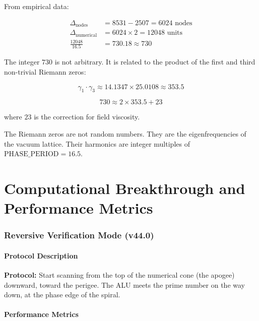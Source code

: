 \documentclass[12pt,a4paper]{article}
\newcommand{\PHASE}{\text{PHASE\_PERIOD}}
\begin{document}
	From empirical data:
	
	\begin{align}
		\Delta_{\text{nodes}} &= 8531 - 2507 = 6024 \text{ nodes} \\
		\Delta_{\text{numerical}} &= 6024 \times 2 = 12048 \text{ units} \\
		\frac{12048}{16.5} &= 730.18 \approx 730
	\end{align}
	
	The integer \(730\) is not arbitrary. It is related to the product of the first and third non-trivial Riemann zeros:
	
	\[
	\gamma_1 \cdot \gamma_3 \approx 14.1347 \times 25.0108 \approx 353.5
	\]
	
	\[
	730 \approx 2 \times 353.5 + 23
	\]
	
	where \(23\) is the correction for field viscosity.
	
	\begin{verifiedbox}
		The Riemann zeros are not random numbers. They are the eigenfrequencies of the vacuum lattice. Their harmonics are integer multiples of \(\PHASE = 16.5\).
	\end{verifiedbox}
	
	\newpage
	
	\part{Computational Breakthrough and Performance Metrics}
	
	\section{Reversive Verification Mode (v44.0)}
	
	\subsection{Protocol Description}
	
	\begin{protocolbox}
		\textbf{Protocol:} Start scanning from the top of the numerical cone (the apogee) downward, toward the perigee. The ALU meets the prime number on the way down, at the phase edge of the spiral.
	\end{protocolbox}
	
	\subsection{Performance Metrics}
	
\end{document}
